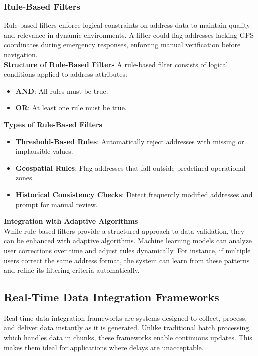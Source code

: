         
        \subsubsection{Rule-Based Filters}
        \label{sssec:rule-based-filters}
        
        Rule-based filters enforce logical constraints on address data to maintain quality and relevance in dynamic environments. A filter could flag addresses lacking GPS coordinates during emergency responses, enforcing manual verification before navigation. \autocite{helpAutodesk2025Jan}\\
        
        
        \textbf{Structure of Rule-Based Filters}\blankLine
        A rule-based filter consists of logical conditions applied to address attributes:
        \begin{itemize}
            \item \textbf{AND}: All rules must be true.
            \item \textbf{OR}: At least one rule must be true.
        \end{itemize}
        

        \textbf{Types of Rule-Based Filters}
        \begin{itemize}
            \item \textbf{Threshold-Based Rules}: Automatically reject addresses with missing or implausible values.
            \item \textbf{Geospatial Rules}: Flag addresses that fall outside predefined operational zones.
            \item \textbf{Historical Consistency Checks}: Detect frequently modified addresses and prompt for manual review.
        \end{itemize}
        
        \textbf{Integration with Adaptive Algorithms}\\
        While rule-based filters provide a structured approach to data validation, they can be enhanced with adaptive algorithms. Machine learning models can analyze user corrections over time and adjust rules dynamically. For instance, if multiple users correct the same address format, the system can learn from these patterns and refine its filtering criteria automatically.
        

    \subsection{Real-Time Data Integration Frameworks}
    Real-time data integration frameworks are systems designed to collect, process, and deliver data instantly as it is generated. Unlike traditional batch processing, which handles data in chunks, these frameworks enable continuous updates. This makes them ideal for applications where delays are unacceptable.

